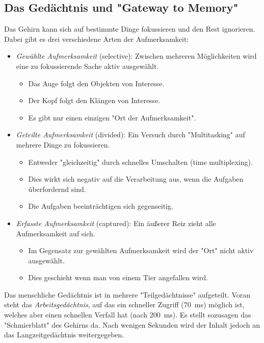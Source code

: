 		\subsection{Das Gedächtnis und "Gateway to Memory"}
			Das Gehirn kann sich auf bestimmte Dinge fokussieren und den Rest ignorieren. Dabei gibt es drei verschiedene Arten der Aufmerksamkeit:
			\begin{itemize}
				\item \emph{Gewählte Aufmerksamkeit} (selective): Zwischen mehreren Möglichkeiten wird eine zu fokussierende Sache aktiv ausgewählt.
					\begin{itemize}
						\item Das Auge folgt den Objekten von Interesse.
						\item Der Kopf folgt den Klängen von Interesse.
						\item Es gibt nur einen einzigen "Ort der Aufmerksamkeit".
					\end{itemize}
				\item \emph{Geteilte Aufmerksamkeit} (divided): Ein Versuch durch "Multitasking" auf mehrere Dinge zu fokussieren.
					\begin{itemize}
						\item Entweder "gleichzeitig" durch schnelles Umschalten (time multiplexing).
						\item Dies wirkt sich negativ auf die Verarbeitung aus, wenn die Aufgaben überfordernd sind.
						\item Die Aufgaben beeinträchtigen sich gegenseitig.
					\end{itemize}
				\item \emph{Erfasste Aufmerksamkeit} (captured): Ein äußerer Reiz zieht alle Aufmerksamkeit auf sich.
					\begin{itemize}
						\item Im Gegensatz zur gewählten Aufmerksamkeit wird der "Ort" nicht aktiv ausgewählt.
						\item Dies geschieht \zB wenn man von einem Tier angefallen wird.
					\end{itemize}
			\end{itemize}

			Das menschliche Gedächtnis ist in mehrere "Teilgedächtnisse" aufgeteilt. Voran steht das \emph{Arbeitsgedächtnis}, auf das ein schneller Zugriff (\ca \SI{70}{\milli\second}) möglich ist, welches aber einen schnellen Verfall hat (nach \ca \SI{200}{\milli\second}). Es stellt sozusagen das "Schmierblatt" des Gehirns da. Nach wenigen Sekunden wird der Inhalt jedoch an das Langzeitgedächtnis weitergegeben.

